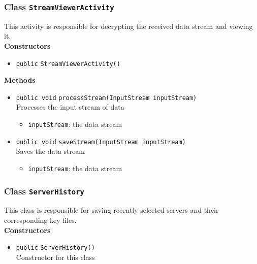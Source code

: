 \subsubsection{Class \lstinline|StreamViewerActivity|}
This activity is responsible for decrypting the received data
 stream and viewing it. \\




\textbf{Constructors}
\begin{itemize}
\item \lstinline|public| \lstinline|StreamViewerActivity|\lstinline|()|




\end{itemize}


\textbf{Methods}
\begin{itemize}
\item \lstinline|public void| \lstinline|processStream|\lstinline|(InputStream inputStream)|\\
Processes the input stream of data
\begin{itemize}
\item \lstinline|inputStream|: the data stream
\end{itemize}



\item \lstinline|public void| \lstinline|saveStream|\lstinline|(InputStream inputStream)|\\
Saves the data stream
\begin{itemize}
\item \lstinline|inputStream|: the data stream
\end{itemize}



\end{itemize}

\subsubsection{Class \lstinline|ServerHistory|}
This class is responsible for saving recently selected servers
 and their corresponding key files. \\




\textbf{Constructors}
\begin{itemize}
\item \lstinline|public| \lstinline|ServerHistory|\lstinline|()|\\
Constructor for this class



\end{itemize}


